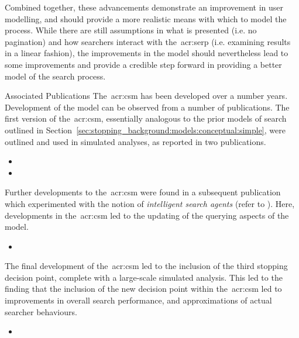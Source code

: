 Combined together, these advancements demonstrate an improvement in user modelling, and should provide a more realistic means with which to model the process. While there are still assumptions in what is presented (i.e. no pagination) and how searchers interact with the~\gls{acr:serp} (i.e. examining results in a linear fashion), the improvements in the model should nevertheless lead to some improvements and provide a credible step forward in providing a better model of the search process.

\vspace*{5mm}
\begin{publications_box}{Associated Publications}
The~\gls{acr:csm} has been developed over a number years. Development of the model can be observed from a number of publications. The first version of the~\gls{acr:csm}, essentially analogous to the prior models of search outlined in Section~\ref{sec:stopping_background:models:conceptual:simple}, were outlined and used in simulated analyses, as reported in two publications.

\begin{itemize}
    \item{}
    \item{}
\end{itemize}

Further developments to the~\gls{acr:csm} were found in a subsequent publication which experimented with the notion of \emph{intelligent search agents} (refer to ). Here, developments in the~\gls{acr:csm} led to the updating of the querying aspects of the model.

\begin{itemize}
    \item{}
\end{itemize}

The final development of the~\gls{acr:csm} led to the inclusion of the third stopping decision point, complete with a large-scale simulated analysis. This led to the finding that the inclusion of the new decision point within the~\gls{acr:csm} led to improvements in overall search performance, and approximations of actual searcher behaviours.

\begin{itemize}
    \item{}
\end{itemize}
\end{publications_box}

